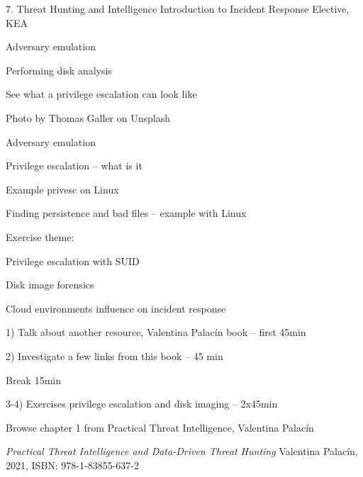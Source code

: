 \documentclass[Screen16to9,17pt]{foils}
\begin{document}
\mytitlepage
{7. Threat Hunting and Intelligence}
{Introduction to Incident Response Elective, KEA}




\begin{list2}
\item Adversary emulation
\item Performing disk analysis
\item See what a privilege escalation can look like
\end{list2}

{\hfill \small Photo by Thomas Galler on Unsplash}


\begin{list2}
\item Adversary emulation
\item Privilege escalation -- what is it
\item Example privesc on Linux
\item Finding persistence and bad files -- example with Linux
\end{list2}

Exercise theme:
\begin{list2}
\item Privilege escalation with SUID
\item Disk image forensics
\item Cloud environments influence on incident response
\end{list2}


\begin{list2}
\item 1) Talk about another resource, Valentina Palacín book  -- first 45min
\item 2) Investigate a few links from this book -- 45 min
\item Break 15min
\item 3-4) Exercises privilege escalation and disk imaging -- 2x45min
\end{list2}





Browse chapter 1 from Practical Threat Intelligence, Valentina Palacín

\emph{Practical Threat Intelligence and Data-Driven Threat Hunting}
Valentina Palacín, 2021, ISBN: 978-1-83855-637-2
\end{document}
